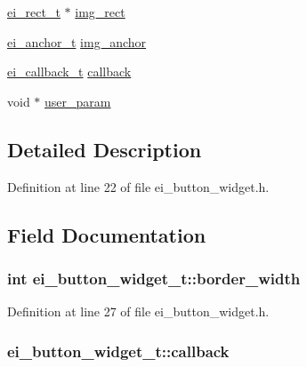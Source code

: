 \begin{DoxyCompactItemize}
\item 
\hyperlink{structei__rect__t}{ei\-\_\-rect\-\_\-t} $\ast$ \hyperlink{structei__button__widget__t_abee8acda30d36052da02e65b28321389}{img\-\_\-rect}
\item 
\hyperlink{ei__types_8h_a3852c963af609d31d7cfcff79c4c8450}{ei\-\_\-anchor\-\_\-t} \hyperlink{structei__button__widget__t_ad0d7ec24f441b9bec4956f68bd9e2cfe}{img\-\_\-anchor}
\item 
\hyperlink{ei__widget_8h_a3692fee0affca071917f22f2ec2018a4}{ei\-\_\-callback\-\_\-t} \hyperlink{structei__button__widget__t_a443fb38f154329e5f1140332f92668af}{callback}
\item 
void $\ast$ \hyperlink{structei__button__widget__t_a22fbd9b5b8759b559ac50b85e64c6e4f}{user\-\_\-param}
\end{DoxyCompactItemize}


\subsection{Detailed Description}


Definition at line 22 of file ei\-\_\-button\-\_\-widget.\-h.



\subsection{Field Documentation}
\hypertarget{structei__button__widget__t_aa2ceeafdf9be60f4d5ef5bb58aa20ca7}{
\subsubsection[{border\-\_\-width}]{\setlength{\rightskip}{0pt plus 5cm}int ei\-\_\-button\-\_\-widget\-\_\-t\-::border\-\_\-width}}\label{structei__button__widget__t_aa2ceeafdf9be60f4d5ef5bb58aa20ca7}


Definition at line 27 of file ei\-\_\-button\-\_\-widget.\-h.

\hypertarget{structei__button__widget__t_a443fb38f154329e5f1140332f92668af}{
\subsubsection[{callback}]{ ei\-\_\-button\-\_\-widget\-\_\-t\-::callback}}\label{structei__button__widget__t_a443fb38f154329e5f1140332f92668af}


